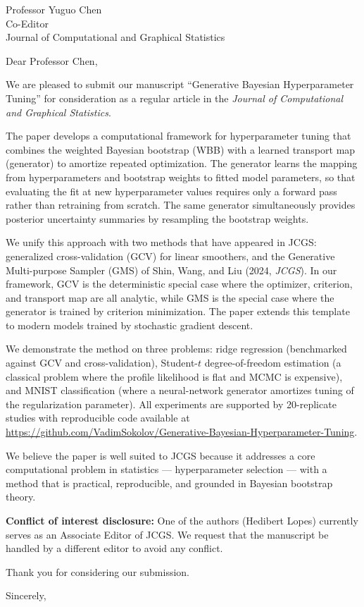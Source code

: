 \documentclass[12pt]{letter}
\begin{document}
\begin{letter}{Professor Yuguo Chen\\Co-Editor\\Journal of Computational and Graphical Statistics}

\opening{Dear Professor Chen,}

We are pleased to submit our manuscript ``Generative Bayesian Hyperparameter Tuning'' for consideration as a regular article in the \textit{Journal of Computational and Graphical Statistics}.

The paper develops a computational framework for hyperparameter tuning that combines the weighted Bayesian bootstrap (WBB) with a learned transport map (generator) to amortize repeated optimization. The generator learns the mapping from hyperparameters and bootstrap weights to fitted model parameters, so that evaluating the fit at new hyperparameter values requires only a forward pass rather than retraining from scratch. The same generator simultaneously provides posterior uncertainty summaries by resampling the bootstrap weights.

We unify this approach with two methods that have appeared in JCGS: generalized cross-validation (GCV) for linear smoothers, and the Generative Multi-purpose Sampler (GMS) of Shin, Wang, and Liu (2024, \textit{JCGS}). In our framework, GCV is the deterministic special case where the optimizer, criterion, and transport map are all analytic, while GMS is the special case where the generator is trained by criterion minimization. The paper extends this template to modern models trained by stochastic gradient descent.

We demonstrate the method on three problems: ridge regression (benchmarked against GCV and cross-validation), Student-$t$ degree-of-freedom estimation (a classical problem where the profile likelihood is flat and MCMC is expensive), and MNIST classification (where a neural-network generator amortizes tuning of the regularization parameter). All experiments are supported by 20-replicate studies with reproducible code available at \url{https://github.com/VadimSokolov/Generative-Bayesian-Hyperparameter-Tuning}.

We believe the paper is well suited to JCGS because it addresses a core computational problem in statistics --- hyperparameter selection --- with a method that is practical, reproducible, and grounded in Bayesian bootstrap theory.

\textbf{Conflict of interest disclosure:} One of the authors (Hedibert Lopes) currently serves as an Associate Editor of JCGS. We request that the manuscript be handled by a different editor to avoid any conflict.

Thank you for considering our submission.

\closing{Sincerely,}

\end{letter}
\end{document}
